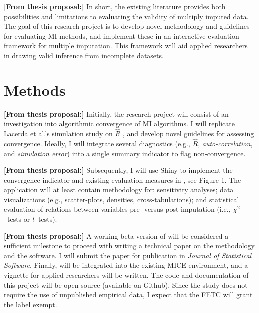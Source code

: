\documentclass[article]{jss}
\begin{document}
\textbf{[From thesis proposal:]} In short, the existing literature provides both possibilities and limitations to evaluating the validity of multiply imputed data. The goal of this research project is to develop novel methodology and guidelines for evaluating MI methods, and implement these in an interactive evaluation framework for multiple imputation. This framework will aid applied researchers in drawing valid inference from incomplete datasets. 




\section{Methods} \label{sec:methods}

\textbf{[From thesis proposal:]} Initially, the research project will consist of an investigation into algorithmic convergence of MI algorithms. I will replicate Lacerda et al.'s simulation study on $\widehat{R}$ \citep{lace07}, and develop novel guidelines for assessing convergence. Ideally, I will integrate several diagnostics (e.g., $\widehat{R}$, \emph{auto-correlation}, and \emph{simulation error}) into a single summary indicator to flag non-convergence. 

\textbf{[From thesis proposal:]} Subsequently, I will use  Shiny \citep{shiny} to implement the convergence indicator and existing evaluation measures in , see Figure 1. The application will at least contain methodology for: sensitivity analyses; data visualizations (e.g., scatter-plots, densities, cross-tabulations); and statistical evaluation of relations between variables pre- versus post-imputation (i.e., $\chi^2$~tests or $t$~tests).

\textbf{[From thesis proposal:]} A working beta version of  will be considered a sufficient milestone to proceed with writing a technical paper on the methodology and the software. I will submit the paper for publication in \emph{Journal of Statistical Software}. Finally,  will be integrated into the existing MICE environment, and a vignette for applied researchers will be written. The  code and documentation of this project will be open source (available on Github). Since the study does not require the use of unpublished empirical data, I expect that the FETC will grant the label exempt. 
\end{document}
